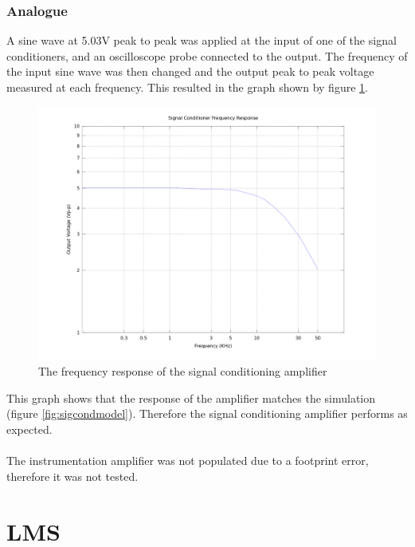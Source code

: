 \subsubsection{Analogue}
A sine wave at 5.03V peak to peak was applied at the input of one of the signal conditioners, and an oscilloscope probe connected to the output.
The frequency of the input sine wave was then changed and the output peak to peak voltage measured at each frequency.
This resulted in the graph shown by figure \ref{fig:sigcondtest}.

\begin{figure}
	\centering
	\includegraphics[width=\textwidth]{./img/sigcondtest.png}
	\caption{The frequency response of the signal conditioning amplifier}
	\label{fig:sigcondtest}
\end{figure}

\noindent This graph shows that the response of the amplifier matches the simulation (figure \ref{fig:sigcondmodel}).
Therefore the signal conditioning amplifier performs as expected.
\\
\\
The instrumentation amplifier was not populated due to a footprint error, therefore it was not tested.

\section{LMS}
\label{ssec:testSWlms}
